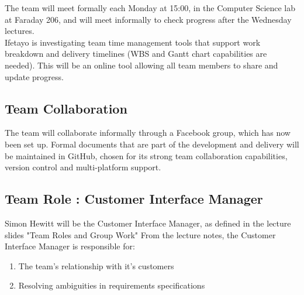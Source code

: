 \documentclass{article}
\begin{document}
The team will meet formally each Monday at 15:00, in the Computer Science lab at Faraday 206, and will meet informally to check progress after the Wednesday lectures.
\\
Ifetayo is investigating team time management tools that support work breakdown and delivery timelines (WBS and Gantt chart capabilities are needed). This will be an online tool allowing all team members to share and update progress.

\subsection {Team Collaboration}
The team will collaborate informally through a Facebook group, which has now been set up. Formal documents that are part of the development and delivery will be maintained in GitHub, chosen for its strong team collaboration  capabilities, version control and multi-platform support.

\newpage
\subsection{Team Role : Customer Interface Manager}

Simon Hewitt will be the Customer Interface Manager, as defined in the lecture slides "Team Roles and Group Work"
From the lecture notes, 
the Customer Interface Manager is responsible for:
\begin{enumerate}
  \item The team's relationship with it's customers
  \item Resolving ambiguities in requirements specifications
\end{enumerate}
\end{document}
